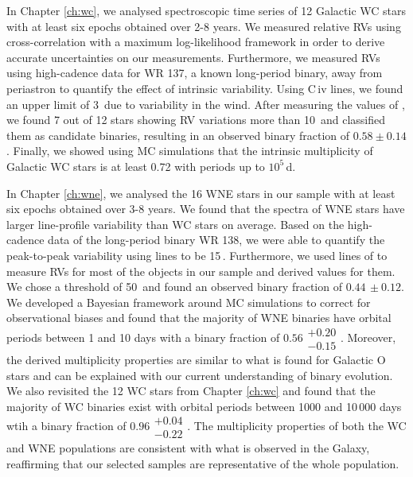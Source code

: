 In Chapter \ref{ch:wc}, we analysed spectroscopic time series of 12 Galactic WC stars with at least six epochs obtained over 2-8 years. We measured relative RVs using cross-correlation with a maximum log-likelihood framework in order to derive accurate uncertainties on our measurements. Furthermore, we measured RVs using high-cadence data for WR 137, a known long-period binary, away from periastron to quantify the effect of intrinsic variability. Using C\,{\sc iv} lines, we found an upper limit of 3\,\kms{} due to variability in the wind. After measuring the values of \DelRV{},
we found 7 out of 12 stars showing RV variations more than 10\,\kms{} and classified them as candidate binaries, resulting in an observed binary fraction of $0.58\pm0.14$. Finally, we showed using MC simulations that the intrinsic multiplicity of Galactic WC stars is at least 0.72 with periods up to $10^5$\,d.

In Chapter \ref{ch:wne}, we analysed the 16 WNE stars in our sample with at least six epochs obtained over 3-8 years. We found that the spectra of WNE stars have larger line-profile variability than WC stars on average. Based on the high-cadence data of the long-period binary WR 138, we were able to quantify the peak-to-peak variability using \nv{} lines to be 15\,\kms{}. Furthermore, we used lines of \nv{} to measure RVs for most of the objects in our sample and derived \DelRV{} values for them. We chose a threshold of 50\,\kms{} and found an observed binary fraction of $0.44\,\pm0.12$. We developed a Bayesian framework around MC simulations to correct for observational biases and found that the majority of WNE binaries have orbital periods between 1 and 10 days with a binary fraction of $0.56\substack{+0.20 \\ -0.15}$. Moreover, the derived multiplicity properties are similar to what is found for Galactic O stars and can be explained with our current understanding of binary evolution. We also revisited the 12 WC stars from Chapter \ref{ch:wc} and found that the majority of WC binaries exist with orbital periods between 1000 and 10\,000 days wtih a binary fraction of $0.96\substack{+0.04 \\ -0.22}$. The multiplicity properties of both the WC and WNE populations are consistent with what is observed in the Galaxy, reaffirming that our selected samples are representative of the whole population.

